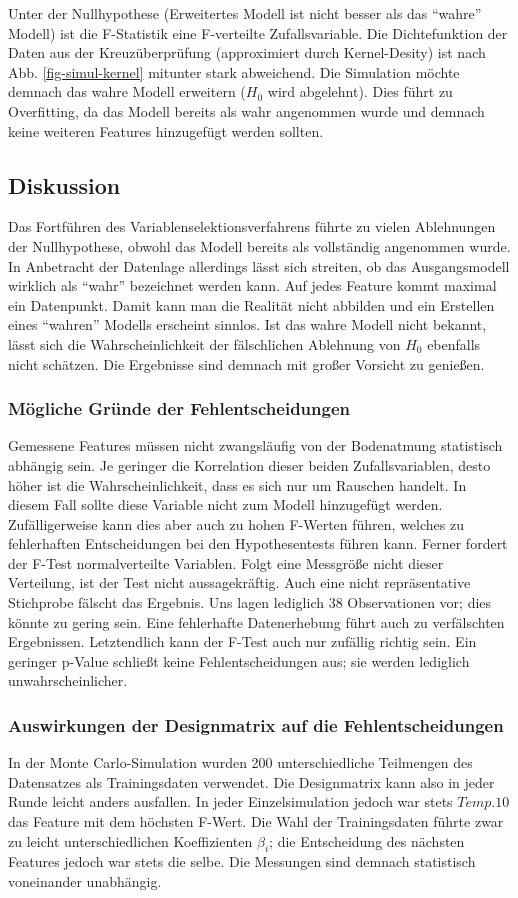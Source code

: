 Unter der Nullhypothese (Erweitertes Modell ist nicht besser als das "`wahre"' Modell) ist die F-Statistik eine F-verteilte Zufallsvariable.
Die Dichtefunktion der Daten aus der Kreuzüberprüfung (approximiert durch Kernel-Desity) ist nach Abb. \ref{fig-simul-kernel} mitunter stark abweichend.
Die Simulation möchte demnach das wahre Modell erweitern ($H_0$ wird abgelehnt).
Dies führt zu Overfitting, da das Modell bereits als wahr angenommen wurde und demnach keine weiteren Features hinzugefügt werden sollten.

\subsection{Diskussion}
Das Fortführen des Variablenselektionsverfahrens führte zu vielen Ablehnungen der Nullhypothese, obwohl das Modell bereits als vollständig angenommen wurde.
In Anbetracht der Datenlage allerdings lässt sich streiten, ob das Ausgangsmodell wirklich als "`wahr"' bezeichnet werden kann.
Auf jedes Feature kommt maximal ein Datenpunkt.
Damit kann man die Realität nicht abbilden und ein Erstellen eines "`wahren"' Modells erscheint sinnlos.
Ist das wahre Modell nicht bekannt, lässt sich die Wahrscheinlichkeit der fälschlichen Ablehnung von $H_0$ ebenfalls nicht schätzen.
Die Ergebnisse sind demnach mit großer Vorsicht zu genießen.

\subsubsection{Mögliche Gründe der Fehlentscheidungen}
Gemessene Features müssen nicht zwangsläufig von der Bodenatmung statistisch abhängig sein.
Je geringer die Korrelation dieser beiden Zufallsvariablen, desto höher ist die Wahrscheinlichkeit, dass es sich nur um Rauschen handelt.
In diesem Fall sollte diese Variable nicht zum Modell hinzugefügt werden.
Zufälligerweise kann dies aber auch zu hohen F-Werten führen, welches zu fehlerhaften Entscheidungen bei den Hypothesentests führen kann.
Ferner fordert der F-Test normalverteilte Variablen.
Folgt eine Messgröße nicht dieser Verteilung, ist der Test nicht aussagekräftig.
Auch eine nicht repräsentative Stichprobe fälscht das Ergebnis.
Uns lagen lediglich 38 Observationen vor; dies könnte zu gering sein.
Eine fehlerhafte Datenerhebung führt auch zu verfälschten Ergebnissen.
Letztendlich kann der F-Test auch nur zufällig richtig sein.
Ein geringer p-Value schließt keine Fehlentscheidungen aus; sie werden lediglich unwahrscheinlicher.

\subsubsection{Auswirkungen der Designmatrix auf die Fehlentscheidungen}
In der Monte Carlo-Simulation wurden 200 unterschiedliche Teilmengen des Datensatzes als Trainingsdaten verwendet.
Die Designmatrix kann also in jeder Runde leicht anders ausfallen.
In jeder Einzelsimulation jedoch war stets $Temp.10$ das Feature mit dem höchsten F-Wert.
Die Wahl der Trainingsdaten führte zwar zu leicht unterschiedlichen Koeffizienten $\beta_i$; die Entscheidung des nächsten Features jedoch war stets die selbe.
Die Messungen sind demnach statistisch voneinander unabhängig.


